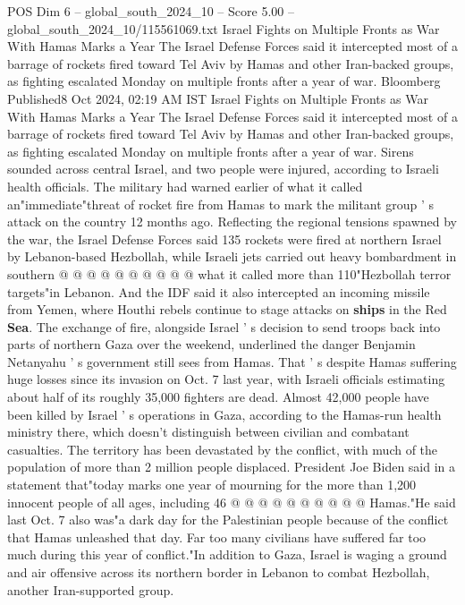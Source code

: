 \begin{textsample}{POS Dim 6 – global\_south\_2024\_10 – Score 5.00 – global\_south\_2024\_10/115561069.txt}  \label{ex:f6_pos_403}
Israel Fights on Multiple Fronts as War With Hamas Marks a Year The Israel Defense Forces said it intercepted most of a barrage of rockets fired toward Tel Aviv by Hamas and other Iran-backed groups, as fighting escalated Monday on multiple fronts after a year of war.
Bloomberg Published8 Oct 2024, 02:19 AM IST Israel Fights on Multiple Fronts as War With Hamas Marks a Year The Israel Defense Forces said it intercepted most of a barrage of rockets fired toward Tel Aviv by Hamas and other Iran-backed groups, as fighting escalated Monday on multiple fronts after a year of war.
Sirens sounded across central Israel, and two people were injured, according to Israeli health officials.
The military had warned earlier of what it called an"immediate"threat of rocket fire from Hamas to mark the militant group ' s attack on the country 12 months ago.
Reflecting the regional tensions spawned by the war, the Israel Defense Forces said 135 rockets were fired at northern Israel by Lebanon-based Hezbollah, while Israeli jets carried out heavy bombardment in southern @ @ @ @ @ @ @ @ @ @ what it called more than 110"Hezbollah terror targets"in Lebanon.
And the IDF said it also intercepted an incoming missile from Yemen, where Houthi rebels continue to stage attacks on \textbf{ships} in the Red \textbf{Sea}.
The exchange of fire, alongside Israel ' s decision to send troops back into parts of northern Gaza over the weekend, underlined the danger Benjamin Netanyahu ' s government still sees from Hamas.
That ' s despite Hamas suffering huge losses since its invasion on Oct. 7 last year, with Israeli officials estimating about half of its roughly 35,000 fighters are dead.
Almost 42,000 people have been killed by Israel ' s operations in Gaza, according to the Hamas-run health ministry there, which doesn't distinguish between civilian and combatant casualties.
The territory has been devastated by the conflict, with much of the population of more than 2 million people displaced.
President Joe Biden said in a statement that"today marks one year of mourning for the more than 1,200 innocent people of all ages, including 46 @ @ @ @ @ @ @ @ @ @ Hamas."He said last Oct. 7 also was"a dark day for the Palestinian people because of the conflict that Hamas unleashed that day.
Far too many civilians have suffered far too much during this year of conflict."In addition to Gaza, Israel is waging a ground and air offensive across its northern border in Lebanon to combat Hezbollah, another Iran-supported group.

\end{textsample}
